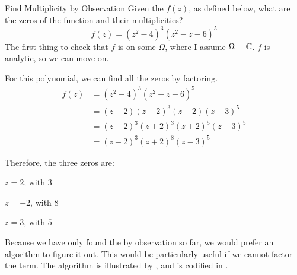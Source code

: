 \begin{example}{Find Multiplicity by Observation}
  Given the  $f(z)$, as defined below, what are the zeros of the function and their multiplicities?
  \begin{equation*}
    f(z) = {(z^{2}-4)}^{3} {(z^{2} - z - 6)}^{5}
  \end{equation*}
  \tcblower{}
  The first thing to check that $f$ is  on some $\Omega$, where I assume $\Omega = \operatorname{\mathbb{C}}$.
  $f$ is analytic, so we can move on.

  For this polynomial, we can find all the zeros by factoring.
  \begin{align*}
    f(z) &= {(z^{2}-4)}^{3} {(z^{2} - z - 6)}^{5} \\
         &= {(z-2) (z+2)}^{3} {(z+2) (z-3)}^{5} \\
         &= {(z-2)}^{3} {(z+2)}^{3} {(z+2)}^{5} {(z-3)}^{5} \\
         &= {(z-2)}^{3} {(z+2)}^{8} {(z-3)}^{5}
  \end{align*}

  Therefore, the three zeros are:
  \begin{description}[noitemsep]
  \item $z=2$, with  $3$
  \item $z=-2$, with  $8$
  \item $z=3$, with  $5$
  \end{description}
\end{example}

Because we have only found the  by observation so far, we would prefer an algorithm to figure it out.
This would be particularly useful if we cannot factor the term.
The algorithm is illustrated by , and is codified in .

